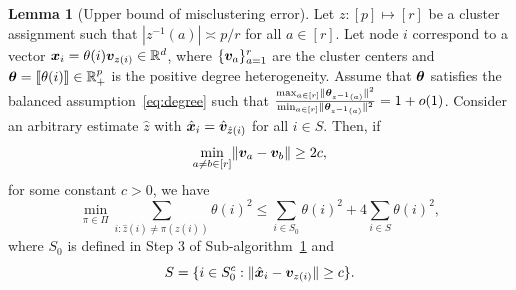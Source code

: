 \documentclass[lettersize,onecolumn,journal]{IEEEtran}
\theoremstyle{definition}
\newtheorem{lem}{Lemma}
\theoremstyle{definition}
\begin{document}
\begin{lem}[Upper bound of misclustering error]\label{lem:upper_mis} Let $z: [p] \mapsto [r]$ be a cluster assignment such that $|z^{-1}(a)| \asymp p/r$ for all $a \in [r]$. Let node $i$ correspond to a vector $\bm x_i  = \theta(i) \bm{v}_{z(i)} \in \mathbb{R}^d$, where $\{\bm{v}_a\}_{a = 1}^r$ are the cluster centers and $\boldsymbol{\theta} = \llbracket \theta(i) \rrbracket \in \mathbb{R}^p_+$ is the positive degree heterogeneity.  Assume that  $\boldsymbol{\theta}$ satisfies the balanced assumption~\eqref{eq:degree} such that ${\max_{a \in [r]} \lVert\boldsymbol{\theta}_{z^{-1}(a)}\rVert^2 \over \min_{a \in [r]} \lVert\boldsymbol{\theta}_{z^{-1}(a)}\rVert^2 }= 1 + o(1)$. Consider an arbitrary estimate $\hat z$ with $\hat {\bm x}_i = \hat {\bm{v}}_{\hat z(i)}$ for all $ i \in S$. Then, if
\begin{equation}\label{eq:upper_mis_cond}
    \min_{a \neq b \in [r]} \onormSize{}{\mv_a - \mv_b} \geq 2c,
\end{equation}
 for some constant $c >0$, we have 
\begin{equation}
    \min_{\pi \in \Pi} \sum_{i : \hat z(i) \neq \pi(z(i))} \theta(i)^2 \leq \sum_{i \in S_0} \theta(i)^2 + 4 \sum_{i \in S} \theta(i)^2,
\end{equation}
where $S_0$ is defined in Step 3 of Sub-algorithm~\hyperref[alg:main]{1} and
\begin{equation}
   S = \{i \in S_0^c: \lVert\hat {\bm x}_i - \bm{v}_{z(i)} \rVert \geq c \}.
\end{equation}

\end{lem}
\end{document}
